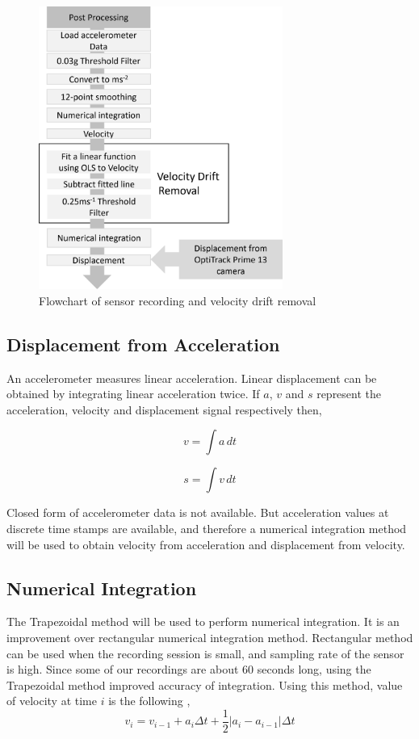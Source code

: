 \documentclass{article}
\begin{document}
\begin{figure}[htp]
    \centering
    \includegraphics[width=8cm]{1.png}
    \caption{Flowchart of sensor recording and velocity drift removal}
\end{figure}

\subsection{Displacement from Acceleration}
An accelerometer measures linear acceleration. Linear displacement can be obtained by integrating linear acceleration twice. If $a$, $v$ and $s$ represent the acceleration, velocity and displacement signal respectively then,

$$v = \int a \,dt$$

$$s = \int v \,dt$$

Closed form of accelerometer data is not available. But acceleration values at discrete time stamps are available, and therefore a numerical integration method will be used to obtain velocity from acceleration and displacement from velocity.

\subsection{Numerical Integration}
The Trapezoidal method will be used to perform numerical integration. It is an improvement over rectangular numerical integration method. Rectangular method can be used when the recording session is small, and sampling rate of the sensor is high. Since some of our recordings are about 60 seconds long, using the Trapezoidal method improved accuracy of integration. Using this method, value of velocity at time $i$ is the following \cite{seifert2007implementing},
$$v_i = v_{i-1} + a_i \Delta t + \frac{1}{2}|a_i - a_{i-1}| \Delta t$$
\end{document}
